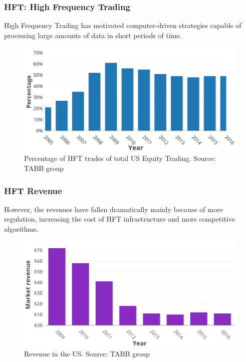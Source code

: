 \documentclass{beamer}
\begin{document}
\begin{frame}
\frametitle{HFT: High Frequency Trading}
High Frequency Trading has motivated computer-driven strategies capable of processing large amounts of data in short periods of time.
\begin{figure}
\includegraphics[width=0.7\paperwidth]{img/HFTmarket}
\caption{Percentage of HFT trades of total US Equity Trading. Source: TABB group}
\end{figure}
\end{frame}


\begin{frame}
\frametitle{HFT Revenue}
However, the revenues have fallen dramatically mainly because of more regulation, increasing the cost of HFT infrastructure and more competitive algorithms.
\begin{figure}
\includegraphics[width=0.7\paperwidth]{img/HFTmarket2}
\caption{Revenue in the US. Source: TABB group}
\end{figure}
\end{frame}
\end{document}
